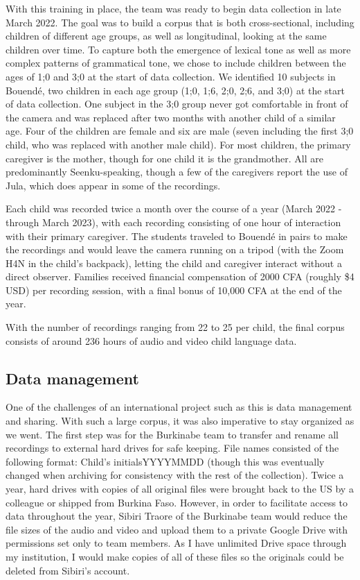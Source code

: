 \documentclass[output=paper,colorlinks,citecolor=brown,
]{langscibook}
\begin{document}
With this training in place, the team was ready to begin data collection in late March 2022. The goal was to build a corpus that is both cross-sectional, including children of different age groups, as well as longitudinal, looking at the same children over time. To capture both the emergence of lexical tone as well as more complex patterns of grammatical tone, we chose to include children between the ages of 1;0 and 3;0 at the start of data collection. We identified 10 subjects in Bouendé, two children in each age group (1;0, 1;6, 2;0, 2;6, and 3;0) at the start of data collection. One subject in the 3;0 group never got comfortable in front of the camera and was replaced after two months with another child of a similar age. Four of the children are female and six are male (seven including the first 3;0 child, who was replaced with another male child). For most children, the primary caregiver is the mother, though for one child it is the grandmother. All are predominantly Seenku-speaking, though a few of the caregivers report the use of Jula, which does appear in some of the recordings. 

Each child was recorded twice a month over the course of a year (March 2022 -through March 2023), with each recording consisting of one hour of interaction with their primary caregiver. The students traveled to Bouendé in pairs to make the recordings and would leave the camera running on a tripod (with the Zoom H4N in the child's backpack), letting the child and caregiver interact without a direct observer. Families received financial compensation of 2000 CFA (roughly \$4 USD) per recording session, with a final bonus of 10,000 CFA at the end of the year. 

With the number of recordings ranging from 22 to 25 per child, the final corpus consists of around 236 hours of audio and video child language data. 

\subsection{Data management}

One of the challenges of an international project such as this is data management and sharing. With such a large corpus, it was also imperative to stay organized as we went. The first step was for the Burkinabe team to transfer and rename all recordings to external hard drives for safe keeping. File names consisted of the following format: Child's initials\textunderscore YYYY\textunderscore MM\textunderscore DD (though this was eventually changed when archiving for consistency with the rest of the collection). Twice a year, hard drives with copies of all original files were brought back to the US by a colleague or shipped from Burkina Faso. However, in order to facilitate access to data throughout the year, Sibiri Traore of the Burkinabe team would reduce the file sizes of the audio and video and upload them to a private Google Drive with permissions set only to team members. As I have unlimited Drive space through my institution, I would make copies of all of these files so the originals could be deleted from Sibiri's account.
\end{document}

